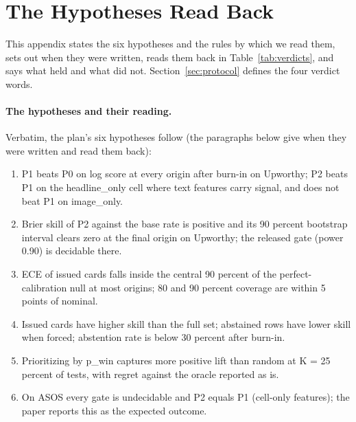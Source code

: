 \section{The Hypotheses Read Back}
\label{sec:verdicts}
This appendix states the six hypotheses and the rules by which we read them, sets out when they were written, reads them back in Table~\ref{tab:verdicts}, and says what held and what did not. Section~\ref{sec:protocol} defines the four verdict words.

\paragraph{The hypotheses and their reading.}\label{sec:hypotheses}
Verbatim, the plan's six hypotheses follow (the paragraphs below give when they were written and read them back):
\begin{enumerate}
\item[H1] P1 beats P0 on log score at every origin after burn-in on Upworthy; P2 beats P1 on the headline\_only cell where text features carry signal, and does not beat P1 on image\_only.
\item[H2] Brier skill of P2 against the base rate is positive and its 90 percent bootstrap interval clears zero at the final origin on Upworthy; the released gate (power 0.90) is decidable there.
\item[H3] ECE of issued cards falls inside the central 90 percent of the perfect-calibration null at most origins; 80 and 90 percent coverage are within 5 points of nominal.
\item[H4] Issued cards have higher skill than the full set; abstained rows have lower skill when forced; abstention rate is below 30 percent after burn-in.
\item[H5] Prioritizing by p\_win captures more positive lift than random at K = 25 percent of tests, with regret against the oracle reported as is.
\item[H6] On ASOS every gate is undecidable and P2 equals P1 (cell-only features); the paper reports this as the expected outcome.
\end{enumerate}

